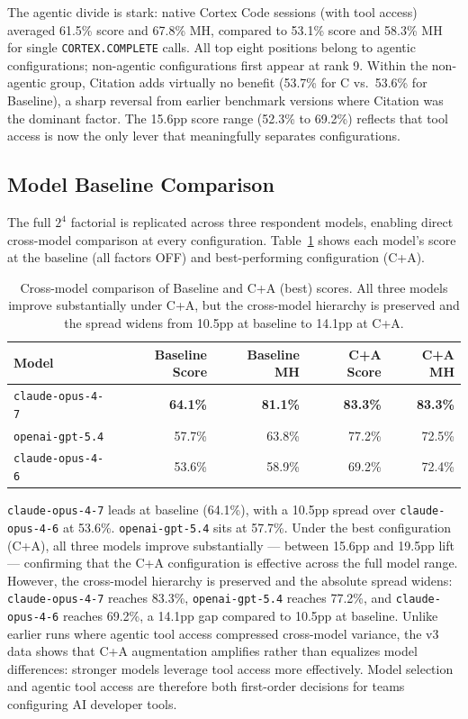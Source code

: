 \documentclass[10pt,letterpaper]{article}
\begin{document}
The agentic divide is stark: native Cortex Code sessions (with tool access) averaged 61.5\% score and 67.8\% MH, compared to 53.1\% score and 58.3\% MH for single \texttt{CORTEX.COMPLETE} calls. All top eight positions belong to agentic configurations; non-agentic configurations first appear at rank 9. Within the non-agentic group, Citation adds virtually no benefit (53.7\% for C vs.\ 53.6\% for Baseline), a sharp reversal from earlier benchmark versions where Citation was the dominant factor. The 15.6pp score range (52.3\% to 69.2\%) reflects that tool access is now the only lever that meaningfully separates configurations.

\subsection{Model Baseline Comparison}
\label{sec:model_baseline}

The full $2^4$ factorial is replicated across three respondent models, enabling direct cross-model comparison at every configuration. Table~\ref{tab:model_comparison} shows each model's score at the baseline (all factors OFF) and best-performing configuration (C+A).

\begin{table}[tbp]
\centering
\caption{Cross-model comparison of Baseline and C+A (best) scores. All three models improve substantially under C+A, but the cross-model hierarchy is preserved and the spread widens from 10.5pp at baseline to 14.1pp at C+A.}
\label{tab:model_comparison}
\small
\begin{tabular}{l r r r r}
\toprule
\textbf{Model} & \textbf{Baseline Score} & \textbf{Baseline MH} & \textbf{C+A Score} & \textbf{C+A MH} \\
\midrule
\texttt{claude-opus-4-7}  & \textbf{64.1\%} & \textbf{81.1\%} & \textbf{83.3\%} & \textbf{83.3\%} \\
\texttt{openai-gpt-5.4}   & 57.7\%          & 63.8\%          & 77.2\%          & 72.5\% \\
\texttt{claude-opus-4-6}  & 53.6\%          & 58.9\%          & 69.2\%          & 72.4\% \\
\bottomrule
\end{tabular}
\end{table}

\texttt{claude-opus-4-7} leads at baseline (64.1\%), with a 10.5pp spread over \texttt{claude-opus-4-6} at 53.6\%. \texttt{openai-gpt-5.4} sits at 57.7\%. Under the best configuration (C+A), all three models improve substantially --- between 15.6pp and 19.5pp lift --- confirming that the C+A configuration is effective across the full model range. However, the cross-model hierarchy is preserved and the absolute spread widens: \texttt{claude-opus-4-7} reaches 83.3\%, \texttt{openai-gpt-5.4} reaches 77.2\%, and \texttt{claude-opus-4-6} reaches 69.2\%, a 14.1pp gap compared to 10.5pp at baseline. Unlike earlier runs where agentic tool access compressed cross-model variance, the v3 data shows that C+A augmentation amplifies rather than equalizes model differences: stronger models leverage tool access more effectively. Model selection and agentic tool access are therefore both first-order decisions for teams configuring AI developer tools.
\end{document}
